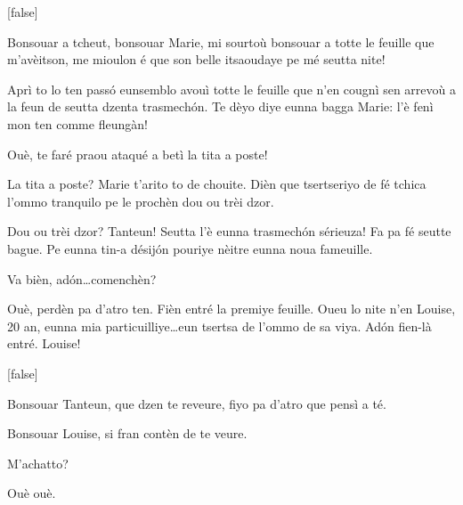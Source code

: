 \begin{drama}
[false]%


\Tanteunspeaks Bonsouar a tcheut, bonsouar Marie, mi sourtoù bonsouar a totte le feuille que m'avèitson, me mioulon é que son belle itsaoudaye pe mé seutta nite! 


\Tanteunspeaks{} Aprì to lo ten pass\'o eunsemblo avouì totte le feuille que n’en cougnì sen arrevoù a la feun de seutta dzenta trasmech\'on. Te dèyo diye eunna bagga Marie: l'è fenì mon ten comme fleungàn!

\Mariespeaks  Ouè, te faré praou ataqué a betì la tita a poste!

\Tanteunspeaks La tita a poste? Marie t’arito to de chouite. Dièn que tsertseriyo de fé tchica l'ommo tranquilo pe le prochèn dou ou trèi dzor.

\Mariespeaks Dou ou trèi dzor? Tanteun! Seutta l'è eunna trasmech\'on sérieuza! Fa pa fé seutte bague. Pe eunna tin-a désij\'on pouriye nèitre eunna noua fameuille.

\Tanteunspeaks{} Va bièn, ad\'on\ldots comenchèn?

\Mariespeaks Ouè, perdèn pa d'atro ten. Fièn entré la premiye feuille. Oueu lo nite n'en Louise, 20 an, eunna mia particuilliye\ldots eun tsertsa de l'ommo de sa viya. Ad\'on fien-là entré. Louise!

[false]%


\Louisespeaks Bonsouar Tanteun, que dzen te reveure, fiyo pa d'atro que pensì a té.

\Tanteunspeaks{} Bonsouar Louise,  si fran contèn de te veure.

\Louisespeaks M'achatto?

\Tanteunspeaks Ouè ouè.


\end{drama}
